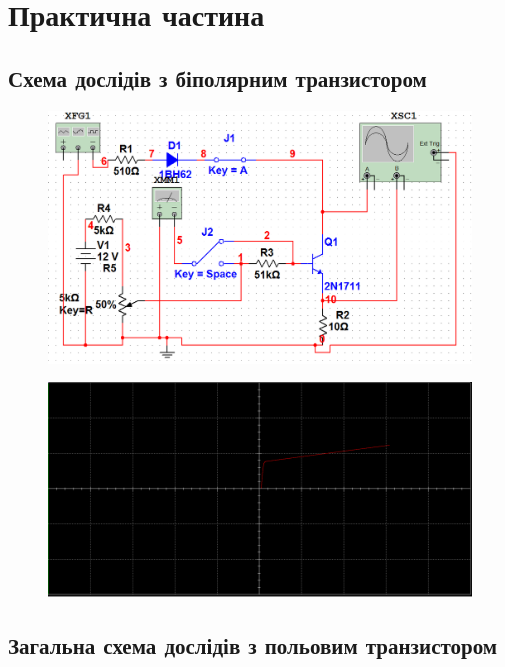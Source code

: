 \section{Практична частина}
\subsection{Схема дослідів з біполярним транзистором}
\begin{figure}[ht]
\centering
\includegraphics[width=1\linewidth]{Pic/first_1.png}
\end{figure}


\begin{figure}[ht]
\centering
\includegraphics[width=1\linewidth]{Pic/first_2.png}
\end{figure}
\newpage


\subsection{Загальна схема дослідів з польовим транзистором}
\setlength{\parindent}{4em}


